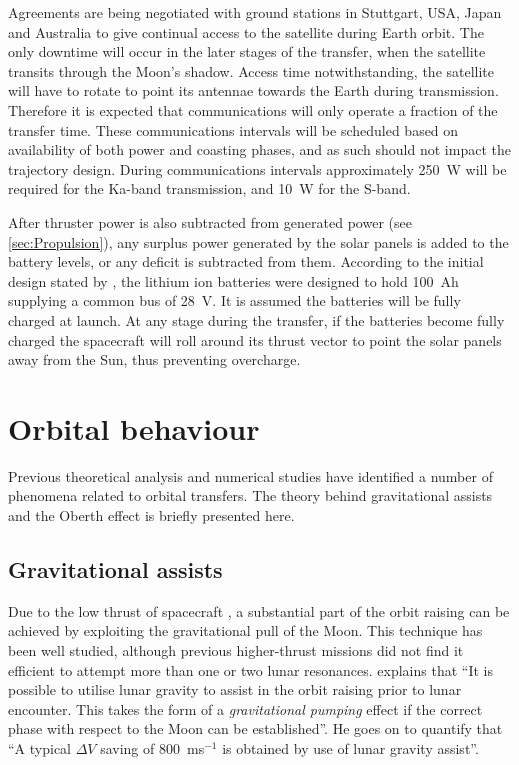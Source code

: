 Agreements are being negotiated with ground stations in Stuttgart, USA, Japan and Australia to give continual access to the satellite during Earth orbit. The only downtime will occur in the later stages of the transfer, when the satellite transits through the Moon's shadow. Access time notwithstanding, the satellite will have to rotate to point its antennae towards the Earth during transmission. Therefore it is expected that communications will only operate a fraction of the transfer time. These communications intervals will be scheduled based on availability of both power and coasting phases, and as such should not impact the trajectory design. During communications intervals approximately 250~W will be required for the Ka-band transmission, and 10~W for the S-band.

After thruster power is also subtracted from generated power (see \autoref{sec:Propulsion}), any surplus power generated by the solar panels is added to the battery levels, or any deficit is subtracted from them. According to the initial design stated by \textcite{Falke2004}, the lithium ion batteries were designed to hold 100~Ah supplying a common bus of 28~V. It is assumed the batteries will be fully charged at launch. At any stage during the transfer, if the batteries become fully charged the spacecraft will roll around its thrust vector to point the solar panels away from the Sun, thus preventing overcharge.


\section{Orbital behaviour}

Previous theoretical analysis and numerical studies have identified a number of phenomena related to orbital transfers. The theory behind gravitational assists and the Oberth effect is briefly presented here.

\subsection{Gravitational assists} \label{sub:Grav-assist}

Due to the low thrust of spacecraft \BW, a substantial part of the orbit raising can be achieved by exploiting the gravitational pull of the Moon. This technique has been well studied, although previous higher-thrust missions did not find it efficient to attempt more than one or two lunar resonances. \textcite{Kemble2006} explains that \enquote{It is possible to utilise lunar gravity to assist in the orbit raising prior to lunar encounter. This takes the form of a \emph{gravitational pumping} effect if the correct phase with respect to the Moon can be established}. He goes on to quantify that \enquote{A typical $\Delta V$ saving of 800~ms$^{-1}$ is obtained by use of lunar gravity assist}. 

